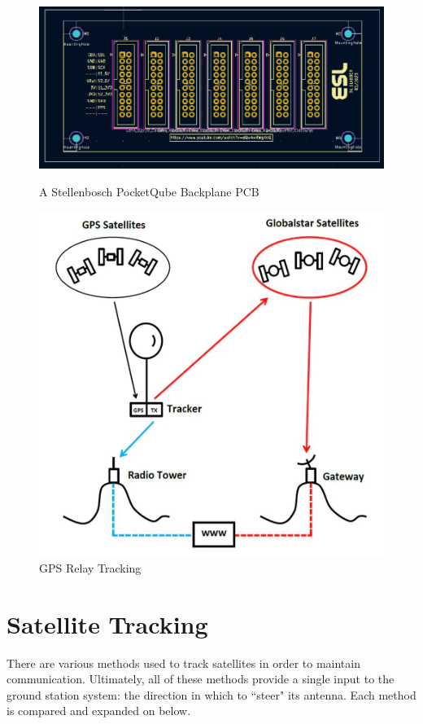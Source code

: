 \graphicspath{{./figures/}}

\begin{figure}[!htb]
  \begin{minipage}{.49\textwidth}
    \centering
    \includegraphics[width=0.95\linewidth]{pq_backplane}
    \caption{A Stellenbosch PocketQube Backplane PCB}
    \label{fig:pq_backplane}
  \end{minipage}
  \begin{minipage}{.49\textwidth}
    \centering
    \includegraphics[width=0.8\linewidth]{gps_relay}
    \caption{GPS Relay Tracking \cite{site-highaltitudescienceTrackingWeather}}
    \label{fig:gps_relay}
  \end{minipage}
\end{figure}

\section{Satellite Tracking}
There are various methods used to track satellites in order to maintain communication. Ultimately, all of these methods provide a single input to the ground station system: the direction in which to ``steer" its antenna. Each method is compared and expanded on below.

